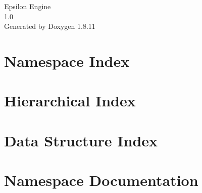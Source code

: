\documentclass[twoside]{book}
\newcommand{\+}{\discretionary{\mbox{\scriptsize$\hookleftarrow$}}{}{}}
\newcommand{\clearemptydoublepage}{%
  \newpage{\pagestyle{empty}\cleardoublepage}%
}
\begin{document}
\hypersetup{pageanchor=false,
             bookmarksnumbered=true,
             pdfencoding=unicode
            }
\begin{titlepage}
\vspace*{7cm}
\begin{center}%
{\Large Epsilon Engine \\[1ex]\large 1.\+0 }\\
\vspace*{1cm}
{\large Generated by Doxygen 1.8.11}\\
\end{center}
\end{titlepage}
\clearemptydoublepage
\tableofcontents
\clearemptydoublepage
{}
\hypersetup{pageanchor=true}

\chapter{Namespace Index}

\chapter{Hierarchical Index}

\chapter{Data Structure Index}

\chapter{Namespace Documentation}




\end{document}
